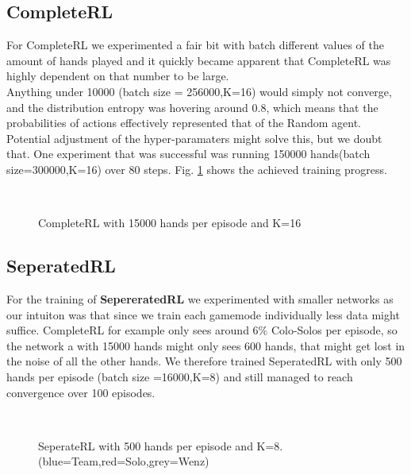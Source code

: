 \subsection{CompleteRL}
For CompleteRL we experimented a fair bit with batch different values of the amount of hands played and it quickly
became apparent that CompleteRL was highly dependent on that number to be large.\\
Anything under 10000 (batch size = 256000,K=16) would simply not converge, and the distribution entropy was hovering
around 0.8, which means that the probabilities of actions effectively represented that of the Random agent.\\
Potential adjustment of the hyper-paramaters might solve this, but we doubt that.
\newline
One experiment that was successful was running 150000 hands(batch size=300000,K=16) over 80 steps.
Fig. \ref{fig:15comp} shows the achieved training progress.
\begin{figure}[!ht]
    \centering
    \quad
    \\
    \quad
    \caption{CompleteRL with 15000 hands per episode and K=16}
    \label{fig:15comp}
\end{figure}

\subsection{SeperatedRL}
For the training of \textbf{SepereratedRL} we experimented with smaller networks as our intuiton was that since we
train each gamemode individually less data might suffice.
CompleteRL for example only sees around 6\% Colo-Solos per episode, so the network a with 15000 hands might only sees
600 hands, that might get lost in the noise of all the other hands.
We therefore trained SeperatedRL with only 500 hands per episode (batch size =16000,K=8) and still managed to
reach convergence over 100 episodes.
\begin{figure}[!h]
    \centering
    \quad
    \\
    \quad
    \caption{SeperateRL with 500 hands per episode and K=8.(blue=Team,red=Solo,grey=Wenz)}
    \label{fig:500sep}
\end{figure}


